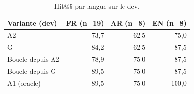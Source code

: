 \begin{table}[H]
\centering
\small
\begin{tabular}{lrrr}
\toprule
Variante (dev) & FR (n=19) & AR (n=8) & EN (n=8) \\
\midrule
A2 & 73{,}7 & 62{,}5 & 75{,}0 \\
G & 84{,}2 & 62{,}5 & 87{,}5 \\
Boucle depuis A2 & 78{,}9 & 75{,}0 & 87{,}5 \\
Boucle depuis G & 89{,}5 & 75{,}0 & 87{,}5 \\
A1 (oracle) & 89{,}5 & 75{,}0 & 100{,}0 \\
\bottomrule
\end{tabular}
\caption{Hit@6 par langue sur le dev.}
\label{tab:bylang}
\end{table}
